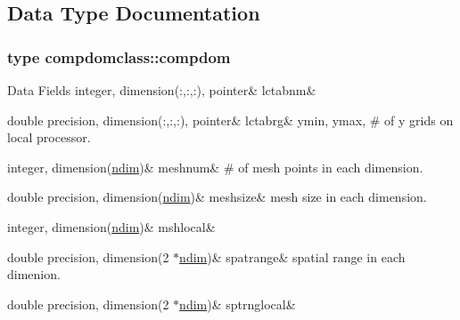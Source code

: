 \subsection{Data Type Documentation}
\label{structcompdomclass_1_1compdom}
\subsubsection{type compdomclass\+::compdom}
\begin{DoxyFields}{Data Fields}
\mbox{\label{namespacecompdomclass_aebcef97b10bb06dc69848b22acaffe70}} 
integer, dimension(:,:,:), pointer&
lctabnm&
\\
\hline

\mbox{\label{namespacecompdomclass_a339ff58ad4edb52e01cf217b9a7f081c}} 
double precision, dimension(:,:,:), pointer&
lctabrg&
ymin, ymax, \# of y grids on local processor. \\
\hline

\mbox{\label{namespacecompdomclass_a80b917ff817964bc120175119768f93e}} 
integer, dimension(\mbox{\hyperlink{namespacecompdomclass_a01f031d8af670f66db4484cd6411e99f}{ndim}})&
meshnum&
\# of mesh points in each dimension. \\
\hline

\mbox{\label{namespacecompdomclass_a13c6277e9ca60fa6a80081b2a0bc91ff}} 
double precision, dimension(\mbox{\hyperlink{namespacecompdomclass_a01f031d8af670f66db4484cd6411e99f}{ndim}})&
meshsize&
mesh size in each dimension. \\
\hline

\mbox{\label{namespacecompdomclass_a21d05738eabd33f56f26879055af6343}} 
integer, dimension(\mbox{\hyperlink{namespacecompdomclass_a01f031d8af670f66db4484cd6411e99f}{ndim}})&
mshlocal&
\\
\hline

\mbox{\label{namespacecompdomclass_a55068267999d67699122c91b366a0682}} 
double precision, dimension(2 $\ast$\mbox{\hyperlink{namespacecompdomclass_a01f031d8af670f66db4484cd6411e99f}{ndim}})&
spatrange&
spatial range in each dimenion. \\
\hline

\mbox{\label{namespacecompdomclass_a2a2654ff7dd41dbb57b11a089e568123}} 
double precision, dimension(2 $\ast$\mbox{\hyperlink{namespacecompdomclass_a01f031d8af670f66db4484cd6411e99f}{ndim}})&
sptrnglocal&
\\
\hline

\end{DoxyFields}


